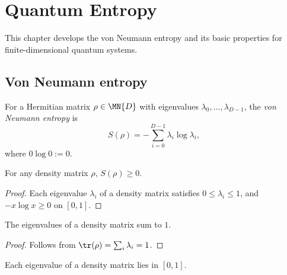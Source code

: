 
\chapter{Quantum Entropy}\label{ch:entropy}

This chapter develops the von Neumann entropy and its basic properties for
finite-dimensional quantum systems.

\section{Von Neumann entropy}

\begin{definition}\label{def:von_neumann_entropy}
    \leanok
    For a Hermitian matrix $\rho \in \MN{D}$ with eigenvalues
    $\lambda_0, \ldots, \lambda_{D-1}$, the \emph{von Neumann entropy} is
    \[
        S(\rho) = -\sum_{i=0}^{D-1} \lambda_i \log \lambda_i,
    \]
    where $0 \log 0 := 0$.
\end{definition}

\begin{theorem}\label{thm:entropy_nonneg}
    \leanok
    For any density matrix $\rho$, $S(\rho) \ge 0$.
\end{theorem}

\begin{proof}\leanok
    Each eigenvalue $\lambda_i$ of a density matrix satisfies
    $0 \le \lambda_i \le 1$, and $-x \log x \ge 0$ on $[0, 1]$.
\end{proof}

\begin{lemma}\label{lem:density_eigenvalues_sum}
    \leanok
    The eigenvalues of a density matrix sum to $1$.
\end{lemma}

\begin{proof}\leanok
    Follows from $\tr(\rho) = \sum_i \lambda_i = 1$.
\end{proof}

\begin{theorem}\label{thm:density_eigenvalues_le_one}
    \leanok
    Each eigenvalue of a density matrix lies in $[0, 1]$.
\end{theorem}

